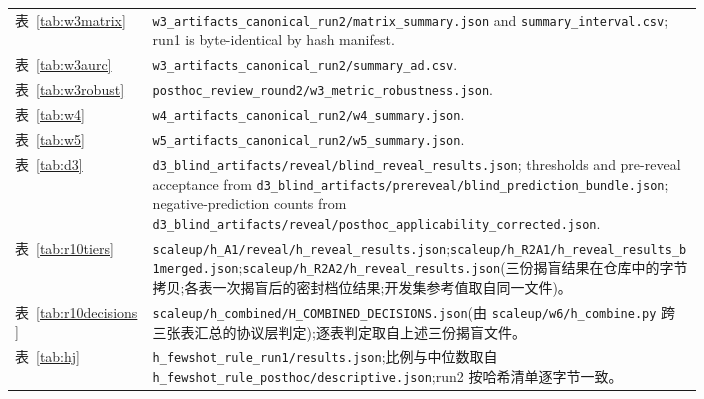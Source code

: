 \documentclass[11pt,a4paper]{ctexart}
\begin{document}
{\begin{longtable}{lp{0.80\linewidth}}
表~\ref{tab:w3matrix} & \texttt{w3\_\allowbreak artifacts\_\allowbreak canonical\_\allowbreak run2/\allowbreak matrix\_\allowbreak summary.json} and \texttt{summary\_\allowbreak interval.csv}; run1 is byte-identical by hash manifest. \\
表~\ref{tab:w3aurc} & \texttt{w3\_\allowbreak artifacts\_\allowbreak canonical\_\allowbreak run2/\allowbreak summary\_\allowbreak ad.csv}. \\
表~\ref{tab:w3robust} & \texttt{posthoc\_\allowbreak review\_\allowbreak round2/\allowbreak w3\_\allowbreak metric\_\allowbreak robustness.json}. \\
表~\ref{tab:w4} & \texttt{w4\_\allowbreak artifacts\_\allowbreak canonical\_\allowbreak run2/\allowbreak w4\_\allowbreak summary.json}. \\
表~\ref{tab:w5} & \texttt{w5\_\allowbreak artifacts\_\allowbreak canonical\_\allowbreak run2/\allowbreak w5\_\allowbreak summary.json}. \\
表~\ref{tab:d3} & \texttt{d3\_\allowbreak blind\_\allowbreak artifacts/\allowbreak reveal/\allowbreak blind\_\allowbreak reveal\_\allowbreak results.json}; thresholds and pre-reveal acceptance from \texttt{d3\_\allowbreak blind\_\allowbreak artifacts/\allowbreak prereveal/\allowbreak blind\_\allowbreak prediction\_\allowbreak bundle.json}; negative-prediction counts from \texttt{d3\_\allowbreak blind\_\allowbreak artifacts/\allowbreak reveal/\allowbreak posthoc\_\allowbreak applicability\_\allowbreak corrected.json}. \\
表~\ref{tab:r10tiers} & \texttt{scaleup/\allowbreak h\_A1/\allowbreak reveal/\allowbreak h\_\allowbreak reveal\_\allowbreak results.json};\texttt{scaleup/\allowbreak h\_R2A1/\allowbreak h\_\allowbreak reveal\_\allowbreak results\_\allowbreak b1merged.json};\texttt{scaleup/\allowbreak h\_R2A2/\allowbreak h\_\allowbreak reveal\_\allowbreak results.json}(三份揭盲结果在仓库中的字节拷贝;各表一次揭盲后的密封档位结果;开发集参考值取自同一文件)。 \\
表~\ref{tab:r10decisions} & \texttt{scaleup/\allowbreak h\_combined/\allowbreak H\_\allowbreak COMBINED\_\allowbreak DECISIONS.json}(由 \texttt{scaleup/\allowbreak w6/\allowbreak h\_\allowbreak combine.py} 跨三张表汇总的协议层判定);逐表判定取自上述三份揭盲文件。 \\
表~\ref{tab:hj} & \texttt{h\_\allowbreak fewshot\_\allowbreak rule\_\allowbreak run1/\allowbreak results.json};比例与中位数取自 \texttt{h\_\allowbreak fewshot\_\allowbreak rule\_\allowbreak posthoc/\allowbreak descriptive.json};run2 按哈希清单逐字节一致。 \\

\end{longtable}}
\end{document}
